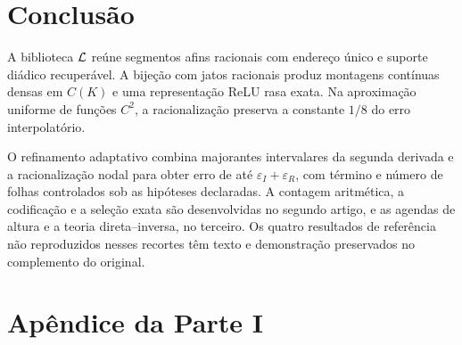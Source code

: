 \begin{figure}[!htbp]
\end{figure}

\section{Conclusão}
A biblioteca $\mathcal L$ reúne segmentos afins racionais com endereço único e suporte diádico recuperável. A bijeção com jatos racionais produz montagens contínuas densas em $C(K)$ e uma representação ReLU rasa exata. Na aproximação uniforme de funções $C^2$, a racionalização preserva a constante $1/8$ do erro interpolatório.

O refinamento adaptativo combina majorantes intervalares da segunda derivada e a racionalização nodal para obter erro de até $\varepsilon_I+\varepsilon_R$, com término e número de folhas controlados sob as hipóteses declaradas. A contagem aritmética, a codificação e a seleção exata são desenvolvidas no segundo artigo, e as agendas de altura e a teoria direta--inversa, no terceiro. Os quatro resultados de referência não reproduzidos nesses recortes têm texto e demonstração preservados no complemento do original.
\clearpage
\section*{Apêndice da Parte I}
\setcounter{section}{0}
